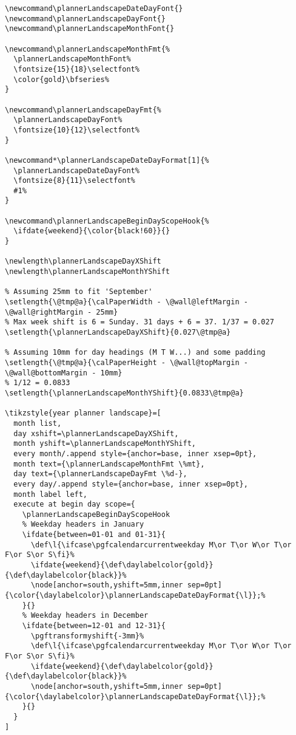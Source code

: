 \documentclass[11pt,oneside]{memoir-article}
\begin{document}
\begin{verbatim}
\newcommand\plannerLandscapeDateDayFont{}
\newcommand\plannerLandscapeDayFont{}
\newcommand\plannerLandscapeMonthFont{}

\newcommand\plannerLandscapeMonthFmt{%
  \plannerLandscapeMonthFont%
  \fontsize{15}{18}\selectfont%
  \color{gold}\bfseries%
}

\newcommand\plannerLandscapeDayFmt{%
  \plannerLandscapeDayFont%
  \fontsize{10}{12}\selectfont%
}

\newcommand*\plannerLandscapeDateDayFormat[1]{%
  \plannerLandscapeDateDayFont%
  \fontsize{8}{11}\selectfont%
  #1%
}

\newcommand\plannerLandscapeBeginDayScopeHook{%
  \ifdate{weekend}{\color{black!60}}{}
}

\newlength\plannerLandscapeDayXShift
\newlength\plannerLandscapeMonthYShift

% Assuming 25mm to fit 'September'
\setlength{\@tmp@a}{\calPaperWidth - \@wall@leftMargin - \@wall@rightMargin - 25mm}
% Max week shift is 6 = Sunday. 31 days + 6 = 37. 1/37 = 0.027
\setlength{\plannerLandscapeDayXShift}{0.027\@tmp@a}

% Assuming 10mm for day headings (M T W...) and some padding
\setlength{\@tmp@a}{\calPaperHeight - \@wall@topMargin - \@wall@bottomMargin - 10mm}
% 1/12 = 0.0833
\setlength{\plannerLandscapeMonthYShift}{0.0833\@tmp@a}

\tikzstyle{year planner landscape}=[
  month list,
  day xshift=\plannerLandscapeDayXShift,
  month yshift=\plannerLandscapeMonthYShift,
  every month/.append style={anchor=base, inner xsep=0pt},
  month text={\plannerLandscapeMonthFmt \%mt},
  day text={\plannerLandscapeDayFmt \%d-},
  every day/.append style={anchor=base, inner xsep=0pt},
  month label left,
  execute at begin day scope={
    \plannerLandscapeBeginDayScopeHook
    % Weekday headers in January
    \ifdate{between=01-01 and 01-31}{
      \def\l{\ifcase\pgfcalendarcurrentweekday M\or T\or W\or T\or F\or S\or S\fi}%
      \ifdate{weekend}{\def\daylabelcolor{gold}}{\def\daylabelcolor{black}}%
      \node[anchor=south,yshift=5mm,inner sep=0pt]{\color{\daylabelcolor}\plannerLandscapeDateDayFormat{\l}};%
    }{}
    % Weekday headers in December
    \ifdate{between=12-01 and 12-31}{
      \pgftransformyshift{-3mm}%
      \def\l{\ifcase\pgfcalendarcurrentweekday M\or T\or W\or T\or F\or S\or S\fi}%
      \ifdate{weekend}{\def\daylabelcolor{gold}}{\def\daylabelcolor{black}}%
      \node[anchor=south,yshift=5mm,inner sep=0pt]{\color{\daylabelcolor}\plannerLandscapeDateDayFormat{\l}};%
    }{}
  }
]
\end{verbatim}
\end{document}

